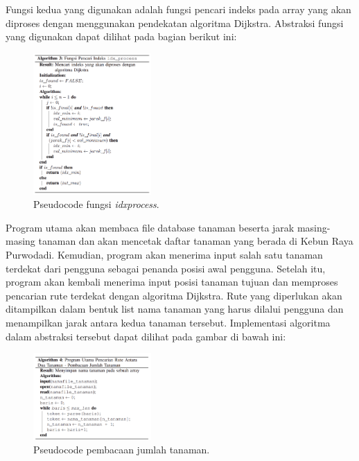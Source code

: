 \documentclass[conference]{IEEEtran}
\begin{document}
    Fungsi kedua yang digunakan adalah fungsi pencari indeks
    pada array yang akan diproses dengan menggunakan pendekatan algoritma Dijkstra. Abstraksi fungsi yang digunakan
    dapat dilihat pada bagian berikut ini:

    \begin{figure}[htbp]
        \centerline{\includegraphics[width=0.4\textwidth]{./sources/idx_process.png}}
        \caption{Pseudocode fungsi \textit{idxprocess}.}
        \label{fig4}
    \end{figure}

    Program utama akan membaca file database tanaman
    beserta jarak masing-masing tanaman dan akan mencetak
    daftar tanaman yang berada di Kebun Raya Purwodadi.
    Kemudian, program akan menerima input salah satu tanaman
    terdekat dari pengguna sebagai penanda posisi awal pengguna.
    Setelah itu, program akan kembali menerima input posisi
    tanaman tujuan dan memproses pencarian rute terdekat dengan
    algoritma Dijkstra. Rute yang diperlukan akan ditampilkan
    dalam bentuk list nama tanaman yang harus dilalui pengguna
    dan menampilkan jarak antara kedua tanaman tersebut.
    Implementasi algoritma dalam abstraksi tersebut dapat dilihat
    pada gambar di bawah ini:
     
    \begin{figure}[htbp]
        \centerline{\includegraphics[width=0.4\textwidth]{./sources/bacaJumlahTanaman.png}}
        \caption{Pseudocode pembacaan jumlah tanaman.}
        \label{fig5}
    \end{figure}  
\end{document}
